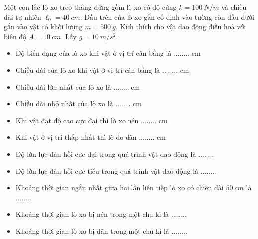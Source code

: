 \begin{vidu}
Một con lắc lò xo treo thẳng đứng gồm lò xo có độ cứng $k=100\ N/m$ và chiều dài tự nhiên $\ell_0=40\ cm$. Đầu trên của lò xo gắn cố định vào tường còn đầu dưới gắn vào vật có khối lượng $m=500\ g$. Kích thích cho vật dao động điều hoà với biên độ $A=10\ cm$. Lấy $g=10\ m/s^2$.
\begin{itemize}
\item[1.] Độ biến dạng của lò xo khi vật ở vị trí cân bằng là ........ cm
\item[2.] Chiều dài của lò xo khi vật ở vị trí cân bằng là ........ cm
\item[3.] Chiều dài lớn nhất của lò xo là ........ cm
\item[4.] Chiều dài nhỏ nhất của lò xo là ........ cm
\item[5.] Khi vật đạt độ cao cực đại thì lò xo nén ........ cm
\item[6.] Khi vật ở vị trí thấp nhất thì lò do dãn ........ cm
\item[7.] Độ lớn lực đàn hồi cực đại trong quá trình vật dao động là ........
\item[8.] Độ lớn lực đàn hồi cực tiểu trong quá trình vật dao động là ........
\item[9.] Khoảng thời gian ngắn nhất giữa hai lần liên tiếp lò xo có chiều dài $50\ cm$ là ........
\item[10.] Khoảng thời gian lò xo bị nén trong một chu kì là ........
\item[11.] Khoảng thời gian lò xo bị dãn trong một chu kì là ........
\end{itemize}
\end{vidu}
